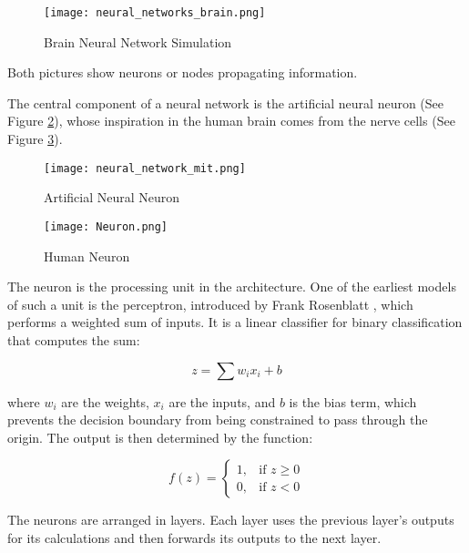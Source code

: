 \begin{figure}
    \centering
    \texttt{[image: neural\_networks\_brain.png]}
    \caption{Brain Neural Network Simulation}
    \label{fig:simulation_brain}
\end{figure}


\bigskip

Both pictures show neurons or nodes propagating information.

The central component of a neural network is the artificial neural neuron (See Figure \ref{fig:ANN}), whose inspiration in the human brain comes from the nerve cells (See Figure \ref{fig:HN}).

\begin{figure}
    \centering
     \texttt{[image: neural\_network\_mit.png]}
    \caption{Artificial Neural Neuron \cite{mit_neural_networks}}
    \label{fig:ANN}
\end{figure}

\begin{figure}
    \centering
    \texttt{[image: Neuron.png]}
    \caption{Human Neuron \cite{seer_neurons}}
    \label{fig:HN}
\end{figure}
The neuron is the processing unit in the architecture. One of the earliest models of such a unit is the perceptron, introduced by Frank Rosenblatt \cite{block1962perceptron}, which performs a weighted sum of inputs. It is a linear classifier for binary classification that computes the sum:

\begin{equation}
z = \sum w_i x_i + b
\end{equation}

where \( w_i \) are the weights, \( x_i \) are the inputs, and \( b \) is the bias term, which prevents the decision boundary from being constrained to pass through the origin. The output is then determined by the function:

\begin{equation}
f(z) =
\begin{cases} 
1, & \text{if } z \geq 0 \\
0, & \text{if } z < 0
\end{cases}
\end{equation}


The neurons are arranged in layers. Each layer uses the previous layer's outputs for its calculations and then forwards its outputs to the next layer.

